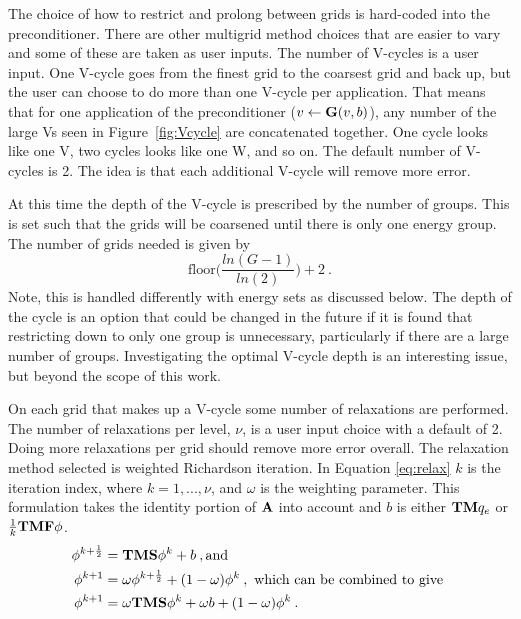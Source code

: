 The choice of how to restrict and prolong between grids is hard-coded into the preconditioner. There are other multigrid method choices that are easier to vary and some of these are taken as user inputs. The number of V-cycles is a user input. One V-cycle goes from the finest grid to the coarsest grid and back up, but the user can choose to do more than one V-cycle per application. That means that for one application of the preconditioner ($v \leftarrow \mathbf{G}(v,b)$), any number of the large Vs seen in Figure~\ref{fig:Vcycle} are concatenated together. One cycle looks like one V, two cycles looks like one W, and so on. The default number of V-cycles is 2. The idea is that each additional V-cycle will remove more error. 

At this time the depth of the V-cycle is prescribed by the number of groups. This is set such that the grids will be coarsened until there is only one energy group. The number of grids needed is given by \cite{BinaryTree2011}
\begin{equation}
  \text{floor}\bigl( \frac{ln(G-1)}{ln(2)}\bigr) + 2 \:.
  \label{eq:NumGrids}
\end{equation}
%
Note, this is handled differently with energy sets as discussed below. The depth of the cycle is an option that could be changed in the future if it is found that restricting down to only one group is unnecessary, particularly if there are a large number of groups. Investigating the optimal V-cycle depth is an interesting issue, but beyond the scope of this work. 

On each grid that makes up a V-cycle some number of relaxations are performed. The number of relaxations per level, $\nu$, is a user input choice with a default of 2. Doing more relaxations per grid should remove more error overall. The relaxation method selected is weighted Richardson iteration. In Equation \eqref{eq:relax} $k$ is the iteration index, where $k = 1, ..., \nu$, and $\omega$ is the weighting parameter. This formulation takes the identity portion of $\mathbf{A}$ into account and $b$ is either $\mathbf{TM}q_{e}$ or $\frac{1}{k}\mathbf{TMF}\phi$.
%
\begin{align}
  \phi^{k + \frac{1}{2}} &= \mathbf{TMS}\phi^{k} + b \:, \text{and} \nonumber \\
  \phi^{k+1} &= \omega \phi^{k + \frac{1}{2}} + (1 - \omega) \phi^{k} \:, \text{ which can be combined to give } \nonumber \\
  \phi^{k+1} &= \omega \mathbf{TMS}\phi^{k} + \omega b + (1 - \omega) \phi^{k} \:. 
  \label{eq:relax}
 \end{align}
 
